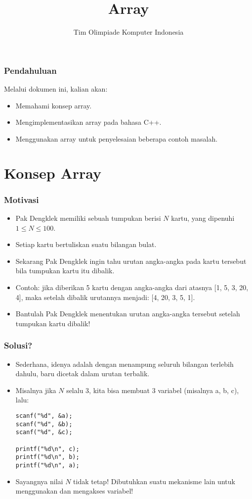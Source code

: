 

\title{Array}
\author{Tim Olimpiade Komputer Indonesia}
\date{}



\begin{frame}
\titlepage
\end{frame}

\begin{frame}
\frametitle{Pendahuluan}
Melalui dokumen ini, kalian akan:
\begin{itemize}
  \item Memahami konsep array.
  \item Mengimplementasikan array pada bahasa C++.
  \item Menggunakan array untuk penyelesaian beberapa contoh masalah.
\end{itemize}
\end{frame}

\section{Konsep Array}
\frame{\sectionpage}

\begin{frame}
\frametitle{Motivasi}
\begin{itemize}
  \item Pak Dengklek memiliki sebuah tumpukan berisi $N$ kartu, yang dipenuhi $1 \le N \le 100$.
  \item Setiap kartu bertuliskan suatu bilangan bulat.
  \item Sekarang Pak Dengklek ingin tahu urutan angka-angka pada kartu tersebut bila tumpukan kartu itu dibalik.
  \item Contoh: jika diberikan 5 kartu dengan angka-angka dari atasnya [1, 5, 3, 20, 4], maka setelah dibalik urutannya menjadi: [4, 20, 3, 5, 1].
  \item Bantulah Pak Dengklek menentukan urutan angka-angka tersebut setelah tumpukan kartu dibalik!
\end{itemize}
\end{frame}

\begin{frame}[fragile]
\frametitle{Solusi?}
\begin{itemize}
  \item Sederhana, idenya adalah dengan menampung seluruh bilangan terlebih dahulu, baru dicetak dalam urutan terbalik.
  \item Misalnya jika $N$ selalu 3, kita bisa membuat 3 variabel (misalnya a, b, c), lalu:
\begin{lstlisting}
scanf("%d", &a);
scanf("%d", &b);
scanf("%d", &c);

printf("%d\n", c);
printf("%d\n", b);
printf("%d\n", a);
\end{lstlisting}
  \item Sayangnya nilai $N$ tidak tetap! Dibutuhkan suatu mekanisme lain untuk menggunakan dan mengakses variabel!
\end{itemize}
\end{frame}

